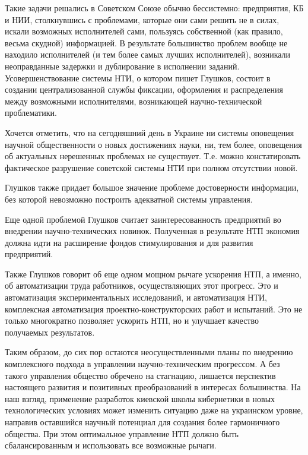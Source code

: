 Такие задачи решались в Советском Союзе обычно бессистемно: предприятия, КБ и
НИИ, столкнувшись с проблемами, которые они сами решить не в силах, искали
возможных исполнителей сами, пользуясь собственной (как правило, весьма скудной)
информацией. В результате большинство проблем вообще не находило исполнителей (и
тем более самых лучших исполнителей), возникали неоправданные задержки и
дублирование в исполнении заданий. Усовершенствование системы НТИ, о котором
пишет Глушков, состоит в создании централизованной службы фиксации, оформления и
распределения между возможными исполнителями, возникающей научно-технической
проблематики.
 
Хочется отметить, что на сегодняшний день в Украине ни системы оповещения
научной общественности о новых достижениях науки, ни, тем более, оповещения об
актуальных нерешенных проблемах не существует. Т.е. можно констатировать
фактическое разрушение советской системы НТИ при полном отсутствии новой.
 
Глушков также придает большое значение проблеме достоверности информации, без
которой невозможно построить адекватной системы управления.
 
Еще одной проблемой Глушков считает заинтересованность предприятий во внедрении
научно-технических новинок. Полученная в результате НТП экономия должна идти на
расширение фондов стимулирования и для развития предприятий.
 
Также Глушков говорит об еще одном мощном рычаге ускорения НТП, а именно, об
автоматизации труда работников, осуществляющих этот прогресс. Это и
автоматизация экспериментальных исследований, и автоматизация НТИ, комплексная
автоматизация проектно-конструкторских работ и испытаний. Это не только
многократно позволяет ускорить НТП, но и улучшает качество получаемых
результатов.
 
Таким образом, до сих пор остаются неосуществленными планы по внедрению
комплексного подхода в управлении научно-техническим прогрессом. А без такого
управления общество обречено на стагнацию, лишается перспектив настоящего
развития и позитивных преобразований в интересах большинства. На наш взгляд,
применение разработок киевской школы кибернетики в новых технологических
условиях может изменить ситуацию даже на украинском уровне, направив оставшийся
научный потенциал для создания более гармоничного общества. При этом оптимальное
управление НТП должно быть сбалансированным и использовать все возможные рычаги.
 
